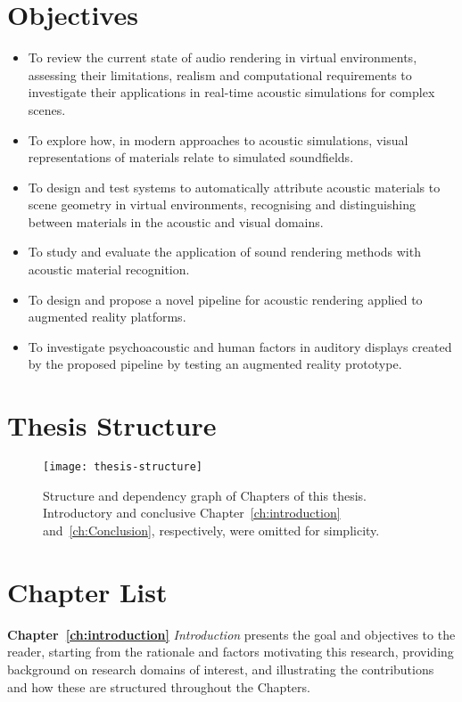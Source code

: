 \section{Objectives}\label{sec:thesis-objectives}
\begin{itemize}
    \item To review the current state of audio rendering in virtual environments, assessing their limitations, realism and computational requirements to investigate their applications in real-time acoustic simulations for complex scenes.
    \item To explore how, in modern approaches to acoustic simulations, visual representations of materials relate to simulated soundfields.
    \item To design and test systems to automatically attribute acoustic materials to scene geometry in virtual environments, recognising and distinguishing between materials in the acoustic and visual domains.
    \item To study and evaluate the application of sound rendering methods with acoustic material recognition.
    \item To design and propose a novel pipeline for acoustic rendering applied to augmented reality platforms.
    \item To investigate psychoacoustic and human factors in auditory displays created by the proposed pipeline by testing an augmented reality prototype.
\end{itemize}

\section{Thesis Structure}

\begin{figure}[htbp]
    \centering
    \texttt{[image: thesis-structure]}
    \caption[Thesis structure overview]{Structure and dependency graph of Chapters of this thesis. Introductory and conclusive Chapter~\ref{ch:introduction} and~\ref{ch:Conclusion}, respectively, were omitted for simplicity.}
    \label{fig:thesis-structure}
\end{figure}

\section{Chapter List}
\textbf{Chapter~\ref{ch:introduction}} \textit{Introduction} presents the goal and objectives to the reader, starting from the rationale and factors motivating this research, providing background on research domains of interest, and illustrating the contributions and how these are structured throughout the Chapters.

